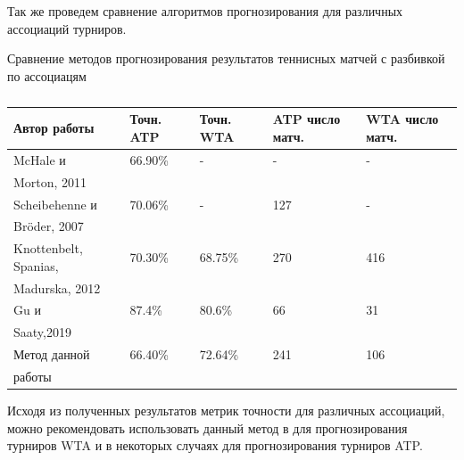 Так же проведем сравнение алгоритмов прогнозирования для различных  ассоциаций турниров.
\begin{table}[]
	
	\caption{\label{tab:issled2}}{Сравнение методов прогнозирования результатов теннисных матчей с разбивкой по ассоциацям}
	
	\begin{center}
		
		\begin{tabular}{|l|l|l|l|l|}
		\hline
		
		Автор работы& Точн. ATP & Точн. WTA&ATP число матч. & WTA число матч. \\
		
		\hline 
		
		McHale и &66.90\%& - & - & -  \\
		Morton, 2011  \cite{Book18} & & & &  \\
		\hline
		Scheibehenne и  & 70.06\% & - & 127 & -  \\
		Bröder,
		2007\cite{Book40} &&&& \\
		\hline
		Knottenbelt, Spanias,& 70.30\% & 68.75\% & 270& 416	\\		Madurska, 2012\cite{Book41} & & && \\
		\hline
		Gu и  &87.4\%& 80.6\%&66&31\\
		 Saaty,2019\cite{Book42}&&&&\\
		\hline
		Метод данной &66.40\%& 72.64\%&241&106\\
		работы &&&&\\
		\hline
			
		\end{tabular}
		
	\end{center}
	
\end{table}
Исходя из полученных результатов метрик точности для различных ассоциаций, можно рекомендовать использовать данный метод в для прогнозирования турниров WTA и в некоторых случаях для прогнозирования турниров ATP.

